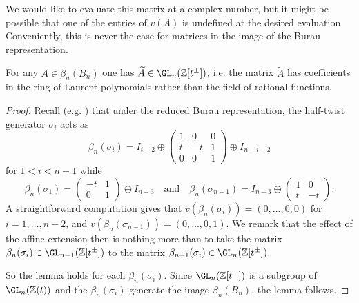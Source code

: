 \documentclass{amsart}
\begin{document}
    We would like to evaluate this matrix at a complex number, but it might be possible that one of the entries of $v(A)$ is undefined at the desired evaluation. Conveniently, this is never the case for matrices in the image of the Burau representation.

    \begin{lemma}\label{lemma:Burau_lands_in_Laurent}
        For any $A \in \beta_n(B_n)$ one has $\widetilde{A} \in \GL_n(\mathbb Z[t^\pm])$, i.e. the matrix $\widetilde A$ has coefficients in the ring of Laurent polynomials rather than the field of rational functions.
    \end{lemma}
    \begin{proof}
        Recall (e.g. \cite[Chapter 3]{Birman1975BraidsAM-82}) that under the reduced Burau representation, the half-twist generator $\sigma_i$ acts as
        \begin{equation*}
            \beta_n(\sigma_i) = I_{i-2} \oplus \begin{pmatrix}
                1 & 0 & 0 \\
                t & -t & 1\\
                0 & 0 & 1
            \end{pmatrix}
            \oplus I_{n-i-2}%
        \end{equation*}
        for $1 < i < n-1$ while
        \begin{equation*}
            \beta_n(\sigma_1) = \begin{pmatrix} -t & 1 \\ 0 & 1 \end{pmatrix} \oplus I_{n-3} \quad \text{and} \quad
            \beta_n(\sigma_{n-1}) = I_{n-3} \oplus \begin{pmatrix} 1 & 0 \\ t & -t \end{pmatrix}.%
        \end{equation*}
        A straightforward computation gives that $v(\beta_n(\sigma_i)) = (0,\dotsc,0,0)$ for $i=1,\dotsc,n-2$, and $v(\beta_n(\sigma_{n-1})) = (0,\dotsc,0,1)$. We remark that the effect of the affine extension then is nothing more than to take the matrix $\beta_n(\sigma_i) \in \GL_{n-1}(\mathbb Z[t^\pm])$ to the matrix $\beta_{n+1}(\sigma_i) \in \GL_n(\mathbb Z[t^\pm])$.
        
        So the lemma holds for each $\beta_n(\sigma_i)$. Since $\GL_n(\mathbb Z[t^\pm])$ is a subgroup of $\GL_n(\mathbb Z(t))$ and the $\beta_n(\sigma_i)$ generate the image $\beta_n(B_n)$, the lemma follows.
    \end{proof}
\end{document}
